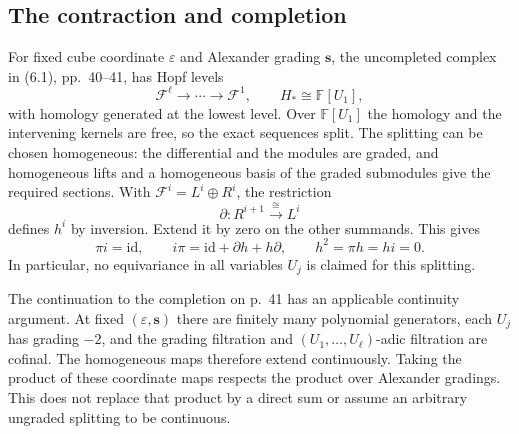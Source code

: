 \documentclass[10pt]{article}
\begin{document}
\subsection*{The contraction and completion}
For fixed cube coordinate \(\varepsilon\) and Alexander grading \(\mathbf s\), the uncompleted complex in (6.1), pp. 40–41, has Hopf levels \[\mathcal F^\ell\longrightarrow\cdots\longrightarrow\mathcal F^1,
 \qquad H_*\cong\mathbb F[U_1],\] with homology generated at the lowest level. Over \(\mathbb F[U_1]\) the homology and the intervening kernels are free, so the exact sequences split. The splitting can be chosen homogeneous: the differential and the modules are graded, and homogeneous lifts and a homogeneous basis of the graded submodules give the required sections. With \(\mathcal F^i=L^i\oplus R^i\), the restriction \[\partial:R^{i+1}\xrightarrow{\ \cong\ }L^i\] defines \(h^i\) by inversion. Extend it by zero on the other summands. This gives \[\pi i=\mathrm{id},\qquad i\pi=\mathrm{id}+\partial h+h\partial,\qquad
 h^2=\pi h=hi=0.\] In particular, no equivariance in all variables \(U_j\) is claimed for this splitting.\par
The continuation to the completion on p. 41 has an applicable continuity argument. At fixed \((\varepsilon,\mathbf s)\) there are finitely many polynomial generators, each \(U_j\) has grading \(-2\), and the grading filtration and \((U_1,\ldots,U_\ell)\)-adic filtration are cofinal. The homogeneous maps therefore extend continuously. Taking the product of these coordinate maps respects the product over Alexander gradings. This does not replace that product by a direct sum or assume an arbitrary ungraded splitting to be continuous.\par
\end{document}
